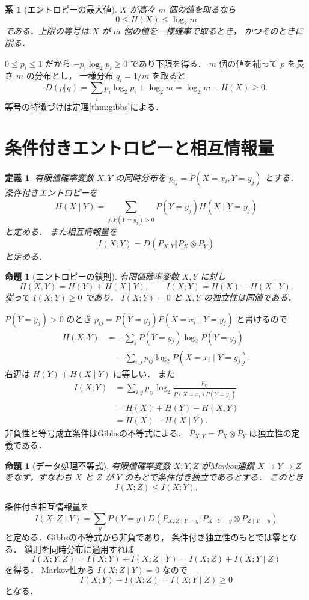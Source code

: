 \documentclass[a5paper,10pt,onecolumn]{jsarticle}
\makeatletter
\theoremstyle{mathnotetheorem}
\newtheorem{definition}[theorem]{定義}
\newtheorem{proposition}[theorem]{命題}
\newtheorem{corollary}[theorem]{系}
\renewcommand{\proofname}{証明}
\renewenvironment{proof}[1][\proofname]{%
  \par\pushQED{\qed}\normalfont\topsep4\p@\@plus2\p@\relax
  \trivlist\item[\hskip\labelsep\bfseries #1]\ignorespaces
}{\popQED\endtrivlist\@endpefalse}
\makeatother
\begin{document}
\begin{corollary}[エントロピーの最大値]\label{cor:max-entropy}
$X$ が高々 $m$ 個の値を取るなら
\[
 0\le H(X)\le\log_2m
\]
である．上限の等号は $X$ が $m$ 個の値を一様確率で取るとき，
かつそのときに限る．
\end{corollary}
\begin{proof}
$0\le p_i\le1$ だから
$-p_i\log_2p_i\ge0$ であり下限を得る．
$m$ 個の値を補って $p$ を長さ $m$ の分布とし，
一様分布 $q_i=1/m$ を取ると
\[
 D(p\Vert q)=\sum_i p_i\log_2p_i+\log_2m
 =\log_2m-H(X)\ge0.
\]
等号の特徴づけは定理\ref{thm:gibbs}による．
\end{proof}

\section{条件付きエントロピーと相互情報量}

\begin{definition}
有限値確率変数 $X,Y$ の同時分布を
$p_{ij}=P(X=x_i,Y=y_j)$ とする．
条件付きエントロピーを
\[
 H(X\mid Y)
 =\sum_{j:P(Y=y_j)>0}P(Y=y_j)H(X\mid Y=y_j)
\]
と定める．
また相互情報量を
\[
 I(X;Y)=D(P_{X,Y}\Vert P_X\otimes P_Y)
\]
と定める．
\end{definition}

\begin{proposition}[エントロピーの鎖則]\label{prop:chain}
有限値確率変数 $X,Y$ に対し
\[
 H(X,Y)=H(Y)+H(X\mid Y),\qquad
 I(X;Y)=H(X)-H(X\mid Y).
\]
従って $I(X;Y)\ge0$ であり，
$I(X;Y)=0$ と $X,Y$ の独立性は同値である．
\end{proposition}
\begin{proof}
$P(Y=y_j)>0$ のとき
$p_{ij}=P(Y=y_j)P(X=x_i\mid Y=y_j)$
と書けるので
\[
 \begin{aligned}
 H(X,Y)
 &=-\sum_jP(Y=y_j)\log_2P(Y=y_j)\\
 &\quad-\sum_{i,j}p_{ij}
       \log_2P(X=x_i\mid Y=y_j).
 \end{aligned}
\]
右辺は $H(Y)+H(X\mid Y)$ に等しい．
また
\begin{align*}
 I(X;Y)
 &=\sum_{i,j}p_{ij}
   \log_2\frac{p_{ij}}{P(X=x_i)P(Y=y_j)}\\
 &=H(X)+H(Y)-H(X,Y)\\
 &=H(X)-H(X\mid Y).
\end{align*}
非負性と等号成立条件はGibbsの不等式による．
$P_{X,Y}=P_X\otimes P_Y$ は独立性の定義である．
\end{proof}

\begin{proposition}[データ処理不等式]\label{prop:dpi}
有限値確率変数 $X,Y,Z$ がMarkov連鎖
$X\to Y\to Z$ をなす，すなわち
$X$ と $Z$ が $Y$ のもとで条件付き独立であるとする．
このとき
\[
 I(X;Z)\le I(X;Y).
\]
\end{proposition}
\begin{proof}
条件付き相互情報量を
\[
 I(X;Z\mid Y)=
 \sum_yP(Y=y)
 D(P_{X,Z\mid Y=y}\Vert
   P_{X\mid Y=y}\otimes P_{Z\mid Y=y})
\]
と定める．Gibbsの不等式から非負であり，
条件付き独立性のもとでは零となる．
鎖則を同時分布に適用すれば
\[
 I(X;Y,Z)=I(X;Y)+I(X;Z\mid Y)
 =I(X;Z)+I(X;Y\mid Z)
\]
を得る．
Markov性から $I(X;Z\mid Y)=0$ なので
\[
 I(X;Y)-I(X;Z)=I(X;Y\mid Z)\ge0
\]
となる．
\end{proof}
\end{document}
